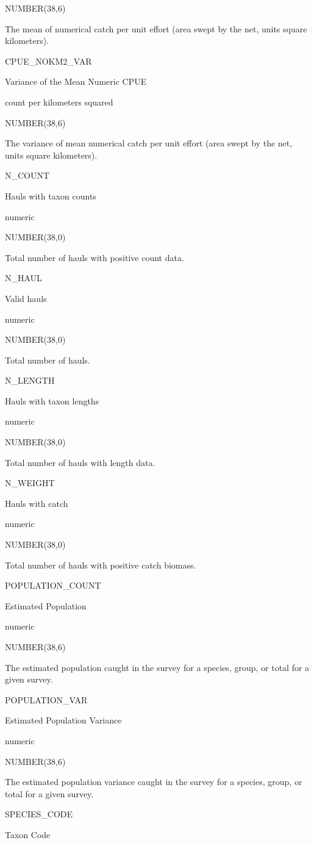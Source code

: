 \documentclass[
  letterpaper,
  oneside,
  open=any]{scrbook}
\begin{document}
NUMBER(38,6)

The mean of numerical catch per unit effort (area swept by the net,
units square kilometers).

CPUE\_NOKM2\_VAR

Variance of the Mean Numeric CPUE

count per kilometers squared

NUMBER(38,6)

The variance of mean numerical catch per unit effort (area swept by the
net, units square kilometers).

N\_COUNT

Hauls with taxon counts

numeric

NUMBER(38,0)

Total number of hauls with positive count data.

N\_HAUL

Valid hauls

numeric

NUMBER(38,0)

Total number of hauls.

N\_LENGTH

Hauls with taxon lengths

numeric

NUMBER(38,0)

Total number of hauls with length data.

N\_WEIGHT

Hauls with catch

numeric

NUMBER(38,0)

Total number of hauls with positive catch biomass.

POPULATION\_COUNT

Estimated Population

numeric

NUMBER(38,6)

The estimated population caught in the survey for a species, group, or
total for a given survey.

POPULATION\_VAR

Estimated Population Variance

numeric

NUMBER(38,6)

The estimated population variance caught in the survey for a species,
group, or total for a given survey.

SPECIES\_CODE

Taxon Code
\end{document}
